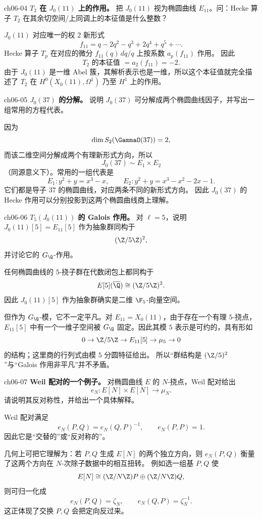 \begin{problem}{ch06-04}
\textbf{$T_2$ 在 $J_0(11)$ 上的作用。}
把 $J_0(11)$ 视为椭圆曲线 $E_{11}$。问：Hecke 算子 $T_2$ 在其余切空间/上同调上的本征值是什么整数？
\end{problem}
\begin{solution}
$J_0(11)$ 对应唯一的权 $2$ 新形式
\[
f_{11}=q-2q^2-q^3+2q^4+q^5+\cdots.
\]
Hecke 算子 $T_p$ 在对应的微分 $f_{11}(q)\,dq/q$ 上按系数 $a_p(f_{11})$ 作用。
因此
\[
T_2\text{ 的本征值 }=a_2(f_{11})=-2.
\]
由于 $J_0(11)$ 是一维 Abel 簇，其解析表示也是一维，所以这个本征值就完全描述了 $T_2$ 在 $H^0(X_0(11),\Omega^1)$ 乃至 $H^1$ 上的作用。
\end{solution}

\begin{problem}{ch06-05}
\textbf{$J_0(37)$ 的分解。}
说明 $J_0(37)$ 可分解成两个椭圆曲线因子，并写出一组常用的方程代表。
\end{problem}
\begin{solution}
因为
\[
\dim S_2(\GammaO(37))=2,
\]
而该二维空间分解成两个有理新形式方向，所以
\[
J_0(37)\sim E_1\times E_2
\]
（同源意义下）。常用的一组代表是
\[
E_1: y^2+y=x^3-x,
\qquad
E_2: y^2+y=x^3-x^2-2x-1.
\]
它们都是导子 $37$ 的椭圆曲线，对应两条不同的新形式方向。
因此 $J_0(37)$ 的 Hecke 作用可以分别投影到这两个椭圆曲线商上理解。
\end{solution}

\begin{problem}{ch06-06}
\textbf{$T_5(J_0(11))$ 的 Galois 作用。}
对 $\ell=5$，说明 $J_0(11)[5]=E_{11}[5]$ 作为抽象群同构于
\[
(\Z/5\Z)^2,
\]
并讨论它的 $G_\Q$-作用。
\end{problem}
\begin{solution}
任何椭圆曲线的 $5$-挠子群在代数闭包上都同构于
\[
E[5](\overline{\Q})\cong (\Z/5\Z)^2.
\]
因此 $J_0(11)[5]$ 作为抽象群确实是二维 $\F_5$-向量空间。

但作为 $G_\Q$-模，它不一定平凡。对 $E_{11}=X_0(11)$，由于存在一个有理 $5$-挠点，
$E_{11}[5]$ 中有一个一维子空间被 $G_\Q$ 固定。因此其模 $5$ 表示是可约的，具有形如
\[
0\to \Z/5\Z\to E_{11}[5]\to \mu_5\to 0
\]
的结构；这里商的行列式由模 $5$ 分圆特征给出。
所以“群结构是 $(\Z/5)^2$”与“Galois 作用非平凡”并不矛盾。
\end{solution}

\begin{problem}{ch06-07}
\textbf{Weil 配对的一个例子。}
对椭圆曲线 $E$ 的 $N$-挠点，Weil 配对给出
\[
e_N:E[N]\times E[N]\to \mu_N.
\]
请说明其反对称性，并给出一个具体解释。
\end{problem}
\begin{solution}
Weil 配对满足
\[
e_N(P,Q)=e_N(Q,P)^{-1},
\qquad e_N(P,P)=1.
\]
因此它是“交替的”或“反对称的”。

几何上可把它理解为：若 $P,Q$ 生成 $E[N]$ 的两个独立方向，则 $e_N(P,Q)$ 衡量了这两个方向在 $N$-次除子数据中的相互扭转。
例如选一组基 $P,Q$ 使
\[
E[N]\cong (\Z/N\Z)P\oplus(\Z/N\Z)Q,
\]
则可归一化成
\[
e_N(P,Q)=\zeta_N,
\qquad e_N(Q,P)=\zeta_N^{-1}.
\]
这正体现了交换 $P,Q$ 会把定向反过来。
\end{solution}

